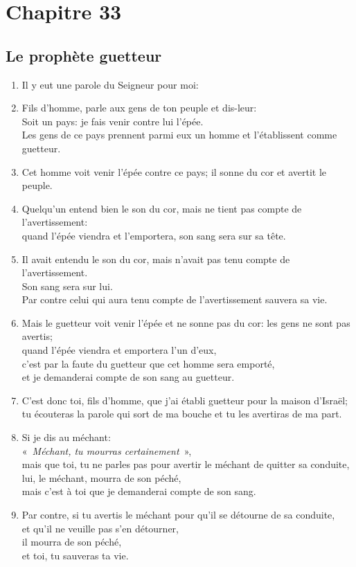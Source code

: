 \noindent
\section*{Chapitre 33}
\subsection*{Le prophète guetteur}
\begin{enumerate}[leftmargin=\psleftmargin, labelsep = \pslabelsep, label={\arabic*}, font=\color{\pscolor}\small\textsuperscript, parsep=0em, itemsep=0em, topsep=0em ]
\item Il y eut une parole du Seigneur pour moi:
\item Fils d’homme, parle aux gens de ton peuple et dis-leur: \\ Soit un pays: je fais venir contre lui l’épée.\\ Les gens de ce pays prennent parmi eux un homme et l’établissent comme guetteur.
\item Cet homme voit venir l’épée contre ce pays; il sonne du cor et avertit le peuple.
\item Quelqu’un entend bien le son du cor, mais ne tient pas compte de l’avertissement: \\ quand l’épée viendra et l’emportera, son sang sera sur sa tête. 
\item Il avait entendu le son du cor, mais n’avait pas tenu compte de l’avertissement. \\ Son sang sera sur lui. \\ Par contre celui qui aura tenu compte de l’avertissement sauvera sa vie. 
\item Mais le guetteur voit venir l’épée et ne sonne pas du cor: les gens ne sont pas avertis; \\ quand l’épée viendra et emportera l’un d’eux, \\ c’est par la faute du guetteur que cet homme sera emporté, 
\\ et je demanderai compte de son sang au guetteur. \parSpace

\item C’est donc toi, fils d’homme, que j’ai établi guetteur pour la maison d’Israël;\\ tu écouteras la parole qui sort de ma bouche et tu les avertiras de ma part.
\item Si je dis au méchant: \\ \decalage «~\textit{Méchant, tu mourras certainement}~»,\\ mais que toi, tu ne parles pas pour avertir le méchant de quitter sa conduite, \\ lui, le méchant, mourra de son péché, \\ mais c’est à toi que je demanderai compte de son sang. 
\item Par contre, si tu avertis le méchant pour qu’il se détourne de sa conduite, \\ et qu’il ne veuille pas s’en détourner, \\ il mourra de son péché, \\ et toi, tu sauveras ta vie. \parSpace


\end{enumerate}
